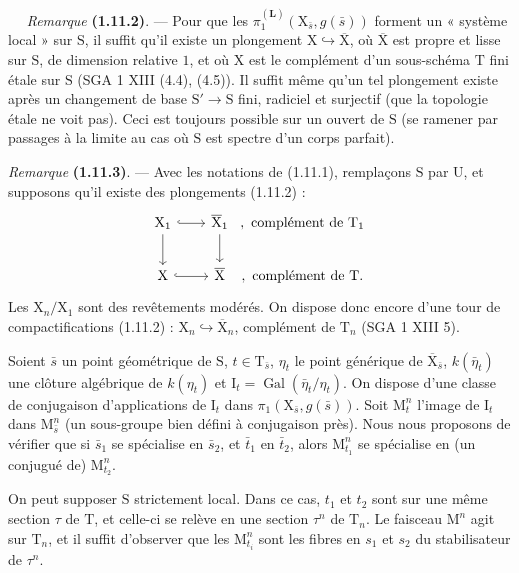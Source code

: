 \documentclass[11pt,leqno]{article}
\newcommand{\Page}[1]{\ifvmode\noindent\else\unskip\ \fi{\footnotesize\textcolor{gray}{[p.\,#1]}}\ \ignorespaces}
\begin{document}
\Page{185}
\textit{Remarque} \textbf{(1.11.2)}. — Pour que les \(\pi_1^{(\mathbf{L})}(\mathrm{X}_{\bar{s}},g(\bar{s}))\) forment un « système local » sur \(\mathrm{S}\), il suffit qu’il existe un plongement \(\mathrm{X}\hookrightarrow\overline{\mathrm{X}}\), où \(\overline{\mathrm{X}}\) est propre et lisse sur \(\mathrm{S}\), de dimension relative \(1\), et où \(\mathrm{X}\) est le complément d’un sous-schéma \(\mathrm{T}\) fini étale sur \(\mathrm{S}\) (SGA 1 XIII (4.4), (4.5)). Il suffit même qu’un tel plongement existe après un changement de base \(\mathrm{S}'\to\mathrm{S}\) fini, radiciel et surjectif (que la topologie étale ne voit pas). Ceci est toujours possible sur un ouvert de \(\mathrm{S}\) (se ramener par passages à la limite au cas où \(\mathrm{S}\) est spectre d’un corps parfait).

\textit{Remarque} \textbf{(1.11.3)}. — Avec les notations de (1.11.1), remplaçons \(\mathrm{S}\) par \(\mathrm{U}\), et supposons qu’il existe des plongements (1.11.2) :
\[
\begin{tikzcd}[column sep=2em,row sep=2em]
\mathrm{X}_1 \arrow[r,hook] \arrow[d]
  & \overline{\mathrm{X}}_1 \arrow[d]
  &[-2em] {,\ \text{complément de }\mathrm{T}_1} \\
\mathrm{X} \arrow[r,hook]
  & \overline{\mathrm{X}}
  &[-2em] {,\ \text{complément de }\mathrm{T}.}
\end{tikzcd}
\]
Les \(\mathrm{X}_n/\mathrm{X}_1\) sont des revêtements modérés. On dispose donc encore d’une tour de compactifications (1.11.2) : \(\mathrm{X}_n\hookrightarrow\overline{\mathrm{X}}_n\), complément de \(\mathrm{T}_n\) (SGA 1 XIII 5).

Soient \(\bar{s}\) un point géométrique de \(\mathrm{S}\), \(t\in\mathrm{T}_{\bar{s}}\), \(\eta_t\) le point générique de \(\overline{\mathrm{X}}_{\bar{s}}\), \(k(\bar{\eta}_t)\) une clôture algébrique de \(k(\eta_t)\) et \(\mathrm{I}_t=\operatorname{Gal}(\bar{\eta}_t/\eta_t)\). On dispose d’une classe de conjugaison d’applications de \(\mathrm{I}_t\) dans \(\pi_1(\mathrm{X}_{\bar{s}},g(\bar{s}))\). Soit \(\mathrm{M}_t^n\) l’image de \(\mathrm{I}_t\) dans \(\mathrm{M}_{\bar{s}}^n\) (un sous-groupe bien défini à conjugaison près). Nous nous proposons de vérifier que si \(\bar{s}_1\) se spécialise en \(\bar{s}_2\), et \(\bar{t}_1\) en \(\bar{t}_2\), alors \(\mathrm{M}_{t_1}^n\) se spécialise en (un conjugué de) \(\mathrm{M}_{t_2}^n\).

On peut supposer \(\mathrm{S}\) strictement local. Dans ce cas, \(t_1\) et \(t_2\) sont sur une même section \(\tau\) de \(\mathrm{T}\), et celle-ci se relève en une section \(\tau^n\) de \(\mathrm{T}_n\). Le faisceau \(\mathrm{M}^n\) agit sur \(\mathrm{T}_n\), et il suffit d’observer que les \(\mathrm{M}_{t_i}^n\) sont les fibres en \(s_1\) et \(s_2\) du stabilisateur de \(\tau^n\).
\end{document}
